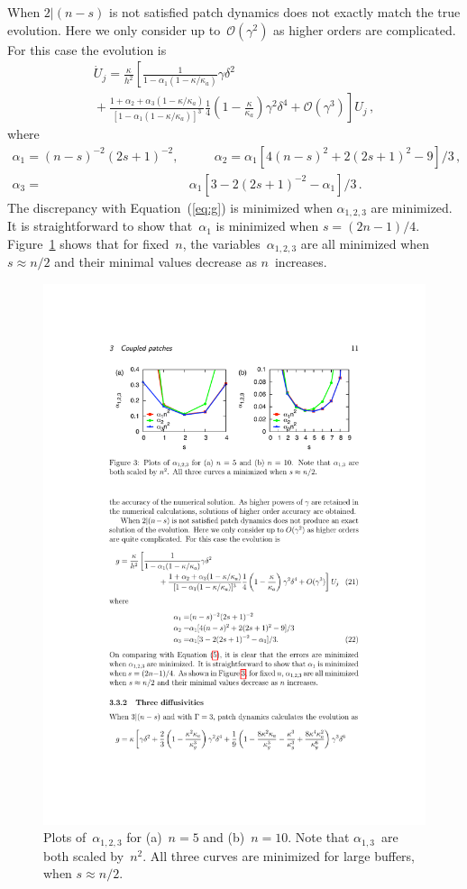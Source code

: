\documentclass[12pt,a4paper]{article}
\begin{document}
When $2|(n-s)$ is not satisfied patch dynamics does not exactly match the true evolution. Here we only consider up to~$\mathcal O(\gamma^2)$ as higher orders are complicated. For this case the evolution is
\begin{multline}
\dot{U}_j=\frac{\kappa}{h^2}\left[\frac{1}{1-\alpha_1(1-\kappa/\kappa_a)}\gamma\delta^2\right.\\
\left.{}+\frac{1+\alpha_2+\alpha_3(1-\kappa/\kappa_a)}{[1-\alpha_1(1-\kappa/\kappa_a)]^3}\frac{1}{4}\left(1-\frac{\kappa}{\kappa_a}\right)\gamma^2\delta^4 +\mathcal O(\gamma^3)\right]U_j\,,
\end{multline}
where
\begin{align}
\alpha_1=(n-s)^{-2}(2s+1)^{-2},&\qquad\alpha_2=\alpha_1[4(n-s)^2+2(2s+1)^2-9]/3\,,\nonumber\\
\alpha_3=&\alpha_1[3-2(2s+1)^{-2}-\alpha_1]/3\,.
\end{align}
The discrepancy with Equation~(\ref{eq:g}) is minimized when $\alpha_{1,2,3}$ are minimized. It is straightforward to show that~$\alpha_1$ is minimized when $s=(2n-1)/4$. Figure~\ref{fig:alpha} shows that for fixed~$n$, the variables~$\alpha_{1,2,3}$ are all minimized when $s\approx n/2$ and their minimal values decrease as $n$~increases. 

\begin{figure}
\centering
\includegraphics[width=13cm]{alpha}
\caption{Plots of~$\alpha_{1,2,3}$ for (a)~$n=5$ and (b)~$n=10$. Note that $\alpha_{1,3}$~are both scaled by~$n^2$. All three curves are minimized for large buffers, when $s\approx n/2$.}
\label{fig:alpha}
\end{figure}
\end{document}
